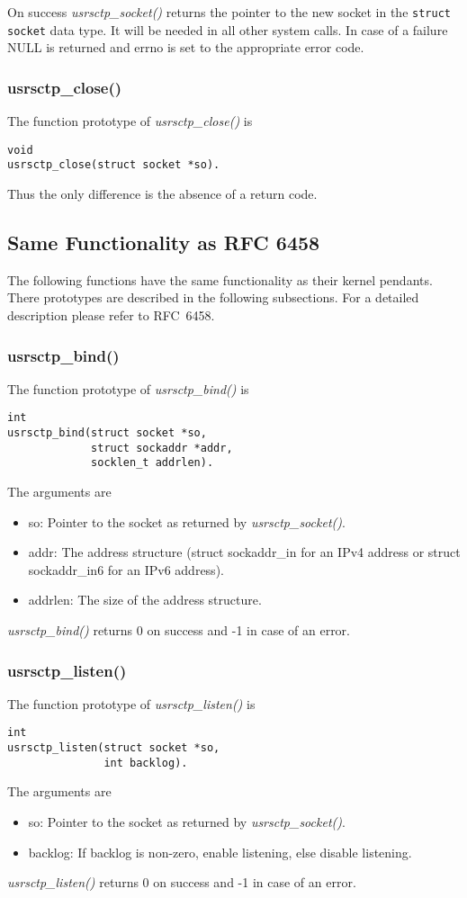 \documentclass[a4paper]{article}
\begin{document}
On success \textit{usrsctp\_socket()} returns the pointer to the new socket in the \texttt{struct socket} data type. 
It will be needed in all other system calls. In case of a failure NULL is returned and
errno is set to the appropriate error code.

\subsubsection{usrsctp\_close()}

The function prototype of \textit{usrsctp\_close()} is 
\begin{verbatim}   
void
usrsctp_close(struct socket *so).
 \end{verbatim}
Thus the only difference is the absence of a return code. 
 
\subsection{Same Functionality as RFC 6458}
The following functions have the same functionality as their kernel pendants. There prototypes
are described in the following subsections. For a detailed description please refer to RFC~6458.

\subsubsection{usrsctp\_bind()}
The function prototype of \textit{usrsctp\_bind()} is 
\begin{verbatim}
int
usrsctp_bind(struct socket *so,
             struct sockaddr *addr,
             socklen_t addrlen).
\end{verbatim}     
The arguments are
\begin{itemize}
\item so: Pointer to the socket as returned by \textit{usrsctp\_socket()}.
\item addr: The address structure (struct sockaddr\_in for an IPv4 address
      or struct sockaddr\_in6 for an IPv6 address).
\item addrlen: The size of the address structure.
\end{itemize}
\textit{usrsctp\_bind()} returns 0 on success and -1 in case of an error.

\subsubsection{usrsctp\_listen()}
The function prototype of \textit{usrsctp\_listen()} is 
\begin{verbatim}
int
usrsctp_listen(struct socket *so,
               int backlog).
 \end{verbatim}      
The arguments are
\begin{itemize}
\item so: Pointer to the socket as returned by \textit{usrsctp\_socket()}.
\item backlog: If backlog is non-zero, enable listening, else disable
      listening.
\end{itemize}
\textit{usrsctp\_listen()} returns 0 on success and -1 in case of an error.
\end{document}
